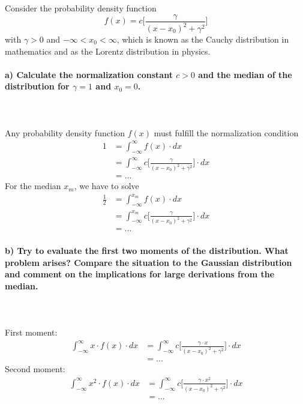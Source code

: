 Consider the probability density function
\begin{equation}
    f(x)=c\bigg[\frac{\gamma}{(x-x_0)^2+\gamma^2}\bigg]
\end{equation}
with $\gamma>0$ and $-\infty<x_0<\infty$, which is known as the 
Cauchy distribution in mathematics and as the Lorentz distribution
in physics.

\paragraph{a) Calculate the normalization constant $c>0$ and the median
    of the distribution for $\gamma=1$ and $x_0=0$.
} \ \\
\\
    Any probability density function $f(x)$ must fulfill the normalization 
    condition
    \begin{align}
        1
        &=\int_{-\infty}^\infty f(x)\cdot dx \\
        &=\int_{-\infty}^\infty c\bigg[
            \frac{\gamma}{(x-x_0)^2+\gamma^2}
        \bigg]\cdot dx \\
        &=...
    \end{align}
    For the median $x_m$, we have to solve
    \begin{align}
        \frac{1}{2}
        &=\int_{-\infty}^{x_m}f(x)\cdot dx \\
        &=\int_{-\infty}^{x_m}c\bigg[
            \frac{\gamma}{(x-x_0)^2+\gamma^2}
        \bigg]\cdot dx \\
        &=...
    \end{align}

\paragraph{b) Try to evaluate the first two moments of the distribution.
    What problem arises? Compare the situation to the Gaussian 
    distribution and comment on the implications for large derivations
    from the median.
} \ \\
\\
    First moment:
    \begin{align}
        \int_{-\infty}^\infty x\cdot f(x)\cdot dx
        &=\int_{-\infty}^\infty c\bigg[
            \frac{\gamma\cdot x}{(x-x_0)^2+\gamma^2}
        \bigg]\cdot dx \\
        &=...
    \end{align}
    Second moment:
    \begin{align}
        \int_{-\infty}^\infty x^2\cdot f(x)\cdot dx
        &=\int_{-\infty}^\infty c\bigg[
            \frac{\gamma\cdot x^2}{(x-x_0)^2+\gamma^2}
        \bigg]\cdot dx \\
        &=...
    \end{align}
